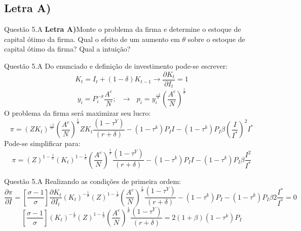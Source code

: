 \documentclass[aspectratio=169]{beamer}
\begin{document}
\subsection{Letra A)}
\begin{frame}{Questão 5.A}
\textbf{Letra A)}Monte o problema da firma e determine o estoque de capital ótimo da firma. Qual o efeito de um aumento em $\theta$ sobre o estoque de capital ótimo da firma? Qual a intuição?
\end{frame}

\begin{frame}{Questão 5.A}
Do enunciado e definição de investimento pode-se escrever:
\begin{equation}
    K_t=I_t +(1-\delta)K_{t-1} \to \frac{\partial K_t}{\partial I_t}=1
\end{equation}
\begin{equation}
    y_i=P_i^{-\sigma}\frac{A^{e}}{N}; \>\>\> \to  \>\>\> p_i=y_i^{\frac{-1}{\sigma}}\left(\frac{A^{e}}{N}\right)^\frac{1}{\sigma}    
\end{equation}
O problema da firma será maximizar seu lucro:
\begin{equation}
    \pi = (ZK_t)^{\frac{-1}{\sigma}}\left(\frac{A^{e}}{N}\right)^\frac{1}{\sigma}
    ZK_t \frac{(1-\tau^Y)}{(r+\delta)} - (1-\tau^k)P_I I-(1-\tau^k)P_I\beta\left(\frac{I}{I^*}\right)^2I^*
\end{equation}
Pode-se simplificar para:
\begin{equation}
    \pi = (Z)^{1-\frac{1}{\sigma}}(K_t)^{1-\frac{1}{\sigma}}\left(\frac{A^{e}}{N}\right)^\frac{1}{\sigma}\frac{(1-\tau^Y)}{(r+\delta)} - (1-\tau^k)P_I I-(1-\tau^k)P_I\beta\frac{I^2}{I^*}
\end{equation}
\end{frame}

\begin{frame}{Questão 5.A}
Realizando as condições de primeira ordem:
\begin{equation}
    \frac{\partial \pi}{\partial I} = \left[\frac{\sigma-1}{\sigma}\right] \frac{\partial K_t}{\partial I_t}\left(K_t\right)^{-\frac{1}{\sigma}}(Z)^{1-\frac{1}{\sigma}}\left(\frac{A^{e}}{N}\right)^\frac{1}{\sigma}\frac{(1-\tau^Y)}{(r+\delta)} - (1-\tau^k)P_I-(1-\tau^k)P_I\beta 2\frac{I^*}{I^*}=0
\end{equation}
\begin{equation}
    \left[\frac{\sigma-1}{\sigma}\right] (K_t)^{-\frac{1}{\sigma}}(Z)^{1-\frac{1}{\sigma}}\left(\frac{A^{e}}{N}\right)^\frac{1}{\sigma}\frac{(1-\tau^Y)}{(r+\delta)} = 2(1+\beta)(1-\tau^k)P_I
\end{equation}
\end{frame}
\end{document}
